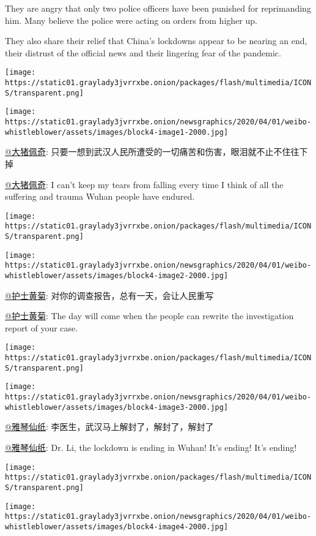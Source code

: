 They are angry that only two police officers have been punished for
reprimanding him. Many believe the police were acting on orders from
higher up.

They also share their relief that China's lockdowns appear to be nearing
an end, their distrust of the official news and their lingering fear of
the pandemic.

\texttt{[image: https://static01.graylady3jvrrxbe.onion/packages/flash/multimedia/ICONS/transparent.png]}

\texttt{[image: https://static01.graylady3jvrrxbe.onion/newsgraphics/2020/04/01/weibo-whistleblower/assets/images/block4-image1-2000.jpg]}

\href{https://www.weibo.com/u/5884209556}{@大猪佩奇}:
只要一想到武汉人民所遭受的一切痛苦和伤害，眼泪就不止不住往下掉

\href{https://www.weibo.com/u/5884209556}{@大猪佩奇}: I can't keep my
tears from falling every time I think of all the suffering and trauma
Wuhan people have endured.

\texttt{[image: https://static01.graylady3jvrrxbe.onion/packages/flash/multimedia/ICONS/transparent.png]}

\texttt{[image: https://static01.graylady3jvrrxbe.onion/newsgraphics/2020/04/01/weibo-whistleblower/assets/images/block4-image2-2000.jpg]}

\href{https://www.weibo.com/u/2059372177?is_hot=1}{@护士黄菊}:
对你的调查报告，总有一天，会让人民重写

\href{https://www.weibo.com/u/2059372177?is_hot=1}{@护士黄菊}: The day
will come when the people can rewrite the investigation report of your
case.

\texttt{[image: https://static01.graylady3jvrrxbe.onion/packages/flash/multimedia/ICONS/transparent.png]}

\texttt{[image: https://static01.graylady3jvrrxbe.onion/newsgraphics/2020/04/01/weibo-whistleblower/assets/images/block4-image3-2000.jpg]}

\href{https://www.weibo.com/u/3097402697?is_hot=1}{@雅琴仙纸}:
李医生，武汉马上解封了，解封了，解封了

\href{https://www.weibo.com/u/3097402697?is_hot=1}{@雅琴仙纸}: Dr. Li,
the lockdown is ending in Wuhan! It's ending! It's ending!

\texttt{[image: https://static01.graylady3jvrrxbe.onion/packages/flash/multimedia/ICONS/transparent.png]}

\texttt{[image: https://static01.graylady3jvrrxbe.onion/newsgraphics/2020/04/01/weibo-whistleblower/assets/images/block4-image4-2000.jpg]}

